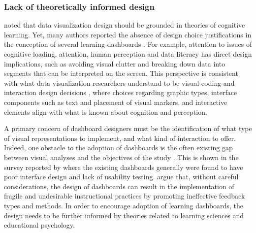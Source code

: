 \documentclass[manuscript,screen,nonacm,12pt]{acmart}
\begin{document}
\subsubsection{Lack of theoretically informed design}
\citet{alhadad2018visualizing} noted that data visualization design should be grounded in theories of cognitive learning. Yet, many authors reported  the absence of design choice justifications in the conception of several learning dashboards \citet{Bodily2017}. For example, attention to issues of cognitive loading, attention, human perception and data literacy has direct design implications, such as avoiding visual clutter and breaking down data into segments that can be interpreted on the screen. This perspective is consistent with what data visualization researchers understand to be visual coding and interaction design decisions \citep{munzner2014visualization}, where choices regarding graphic types, interface components such as text and placement of visual markers, and interactive elements align with what is known about cognition and perception.




A primary concern of dashboard designers must be the identification of what type of visual representations to implement, and what kind of interaction to offer. Indeed, one obstacle to the adoption of dashboards is the often existing gap between visual analyses and the objectives of the study  \citep{Roberts2017}. This is shown in the survey reported by \citep{Reimers2015} where the existing dashboards generally were found to have poor interface design and lack of usability testing. 
\citet{Gavsevic2015} argue that, without careful considerations, the design of dashboards can result in the implementation of fragile and undesirable instructional practices by promoting ineffective feedback types and methods. 
In order to encourage adoption of learning dashboards, the design needs to be further informed by theories related to learning sciences and educational psychology. 
\end{document}
